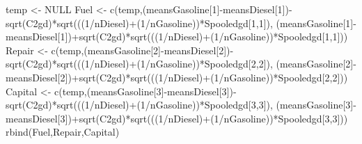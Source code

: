 \documentclass[
]{article}
\newenvironment{Shaded}{\begin{snugshade}}{\end{snugshade}}
\newcommand{\ConstantTok}[1]{\textcolor[rgb]{0.00,0.00,0.00}{#1}}
\newcommand{\DecValTok}[1]{\textcolor[rgb]{0.00,0.00,0.81}{#1}}
\newcommand{\FunctionTok}[1]{\textcolor[rgb]{0.00,0.00,0.00}{#1}}
\newcommand{\NormalTok}[1]{#1}
\newcommand{\OtherTok}[1]{\textcolor[rgb]{0.56,0.35,0.01}{#1}}
\newcommand{\SpecialCharTok}[1]{\textcolor[rgb]{0.00,0.00,0.00}{#1}}
\begin{document}
\begin{Shaded}
\begin{Highlighting}[]
\NormalTok{temp }\OtherTok{\textless{}{-}} \ConstantTok{NULL}
\NormalTok{Fuel }\OtherTok{\textless{}{-}} \FunctionTok{c}\NormalTok{(temp,(meansGasoline[}\DecValTok{1}\NormalTok{]}\SpecialCharTok{{-}}\NormalTok{meansDiesel[}\DecValTok{1}\NormalTok{])}\SpecialCharTok{{-}}\FunctionTok{sqrt}\NormalTok{(C2gd)}\SpecialCharTok{*}\FunctionTok{sqrt}\NormalTok{(((}\DecValTok{1}\SpecialCharTok{/}\NormalTok{nDiesel)}\SpecialCharTok{+}\NormalTok{(}\DecValTok{1}\SpecialCharTok{/}\NormalTok{nGasoline))}\SpecialCharTok{*}\NormalTok{Spooledgd[}\DecValTok{1}\NormalTok{,}\DecValTok{1}\NormalTok{]),}
\NormalTok{          (meansGasoline[}\DecValTok{1}\NormalTok{]}\SpecialCharTok{{-}}\NormalTok{meansDiesel[}\DecValTok{1}\NormalTok{])}\SpecialCharTok{+}\FunctionTok{sqrt}\NormalTok{(C2gd)}\SpecialCharTok{*}\FunctionTok{sqrt}\NormalTok{(((}\DecValTok{1}\SpecialCharTok{/}\NormalTok{nDiesel)}\SpecialCharTok{+}\NormalTok{(}\DecValTok{1}\SpecialCharTok{/}\NormalTok{nGasoline))}\SpecialCharTok{*}\NormalTok{Spooledgd[}\DecValTok{1}\NormalTok{,}\DecValTok{1}\NormalTok{]))}
\NormalTok{Repair }\OtherTok{\textless{}{-}} \FunctionTok{c}\NormalTok{(temp,(meansGasoline[}\DecValTok{2}\NormalTok{]}\SpecialCharTok{{-}}\NormalTok{meansDiesel[}\DecValTok{2}\NormalTok{])}\SpecialCharTok{{-}}\FunctionTok{sqrt}\NormalTok{(C2gd)}\SpecialCharTok{*}\FunctionTok{sqrt}\NormalTok{(((}\DecValTok{1}\SpecialCharTok{/}\NormalTok{nDiesel)}\SpecialCharTok{+}\NormalTok{(}\DecValTok{1}\SpecialCharTok{/}\NormalTok{nGasoline))}\SpecialCharTok{*}\NormalTok{Spooledgd[}\DecValTok{2}\NormalTok{,}\DecValTok{2}\NormalTok{]),}
\NormalTok{          (meansGasoline[}\DecValTok{2}\NormalTok{]}\SpecialCharTok{{-}}\NormalTok{meansDiesel[}\DecValTok{2}\NormalTok{])}\SpecialCharTok{+}\FunctionTok{sqrt}\NormalTok{(C2gd)}\SpecialCharTok{*}\FunctionTok{sqrt}\NormalTok{(((}\DecValTok{1}\SpecialCharTok{/}\NormalTok{nDiesel)}\SpecialCharTok{+}\NormalTok{(}\DecValTok{1}\SpecialCharTok{/}\NormalTok{nGasoline))}\SpecialCharTok{*}\NormalTok{Spooledgd[}\DecValTok{2}\NormalTok{,}\DecValTok{2}\NormalTok{]))}
\NormalTok{Capital }\OtherTok{\textless{}{-}} \FunctionTok{c}\NormalTok{(temp,(meansGasoline[}\DecValTok{3}\NormalTok{]}\SpecialCharTok{{-}}\NormalTok{meansDiesel[}\DecValTok{3}\NormalTok{])}\SpecialCharTok{{-}}\FunctionTok{sqrt}\NormalTok{(C2gd)}\SpecialCharTok{*}\FunctionTok{sqrt}\NormalTok{(((}\DecValTok{1}\SpecialCharTok{/}\NormalTok{nDiesel)}\SpecialCharTok{+}\NormalTok{(}\DecValTok{1}\SpecialCharTok{/}\NormalTok{nGasoline))}\SpecialCharTok{*}\NormalTok{Spooledgd[}\DecValTok{3}\NormalTok{,}\DecValTok{3}\NormalTok{]),}
\NormalTok{          (meansGasoline[}\DecValTok{3}\NormalTok{]}\SpecialCharTok{{-}}\NormalTok{meansDiesel[}\DecValTok{3}\NormalTok{])}\SpecialCharTok{+}\FunctionTok{sqrt}\NormalTok{(C2gd)}\SpecialCharTok{*}\FunctionTok{sqrt}\NormalTok{(((}\DecValTok{1}\SpecialCharTok{/}\NormalTok{nDiesel)}\SpecialCharTok{+}\NormalTok{(}\DecValTok{1}\SpecialCharTok{/}\NormalTok{nGasoline))}\SpecialCharTok{*}\NormalTok{Spooledgd[}\DecValTok{3}\NormalTok{,}\DecValTok{3}\NormalTok{]))}
\FunctionTok{rbind}\NormalTok{(Fuel,Repair,Capital)}
\end{Highlighting}
\end{Shaded}
\end{document}
